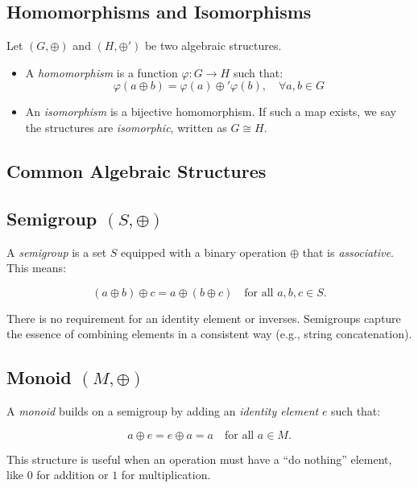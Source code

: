 \subsection{Homomorphisms and Isomorphisms}

Let \((G, \oplus)\) and \((H, \oplus')\) be two algebraic structures.

\begin{itemize}[label=\(-\)]
    \item A \emph{homomorphism} is a function \(\varphi: G \rightarrow H\) such that:
    \[
    \varphi(a \oplus b) = \varphi(a) \oplus' \varphi(b), \quad \forall a,b \in G
    \]
    
    \item An \emph{isomorphism} is a bijective homomorphism. If such a map exists, we say the structures are \emph{isomorphic}, written as \(G \cong H\).
\end{itemize}

\subsection{Common Algebraic Structures}

\subsection{Semigroup \texorpdfstring{\((S, \oplus)\)}{}}

A \emph{semigroup} is a set \(S\) equipped with a binary operation \(\oplus\) that is \emph{associative}. This means:

\[
(a \oplus b) \oplus c = a \oplus (b \oplus c) \quad \text{for all } a, b, c \in S.
\]

There is no requirement for an identity element or inverses. Semigroups capture the essence of combining elements in a consistent way (e.g., string concatenation).

\subsection{Monoid \texorpdfstring{\((M, \oplus)\)}{}}

A \emph{monoid} builds on a semigroup by adding an \emph{identity element} \(e\) such that:

\[
a \oplus e = e \oplus a = a \quad \text{for all } a \in M.
\]

This structure is useful when an operation must have a “do nothing” element, like \(0\) for addition or \(1\) for multiplication.

